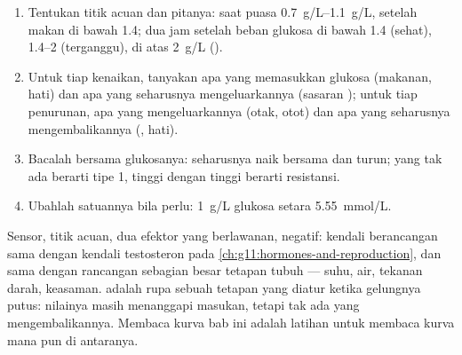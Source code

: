 \begin{method}\label{met:g12:glucose-and-diabetes:read}
\begin{enumerate}
  \item Tentukan titik acuan dan pitanya: saat puasa \qtyrange{0.7}{1.1}{g/L},
        setelah makan di bawah \num{1.4}; dua jam setelah beban glukosa
        di bawah \num{1.4} (sehat), \qtyrange{1.4}{2}{} (terganggu),
        di atas \qty{2}{g/L} ().
  \item Untuk tiap kenaikan, tanyakan apa yang memasukkan glukosa
        (makanan, hati) dan apa yang seharusnya mengeluarkannya
        (sasaran ); untuk tiap penurunan, apa yang
        mengeluarkannya (otak, otot) dan apa yang seharusnya
        mengembalikannya (, hati).
  \item Bacalah  bersama glukosanya:  seharusnya naik
        bersama  dan  turun;  yang tak ada
        berarti tipe 1,  tinggi dengan  tinggi berarti
        resistansi.
  \item Ubahlah satuannya bila perlu: \qty{1}{g/L} glukosa setara
        \qty{5.55}{mmol/L}.
\end{enumerate}
\end{method}

\begin{remark}\label{rem:g12:glucose-and-diabetes:model}
Sensor, titik acuan, dua efektor yang berlawanan,  negatif:
kendali  berancangan sama dengan kendali testosteron pada
\cref{ch:g11:hormones-and-reproduction}, dan sama dengan rancangan
sebagian besar tetapan tubuh --- suhu, air, tekanan darah, keasaman.
 adalah rupa sebuah tetapan yang diatur ketika gelungnya
putus: nilainya masih menanggapi masukan, tetapi tak ada yang
mengembalikannya. Membaca kurva bab ini adalah latihan untuk membaca
kurva mana pun di antaranya.
\end{remark}

